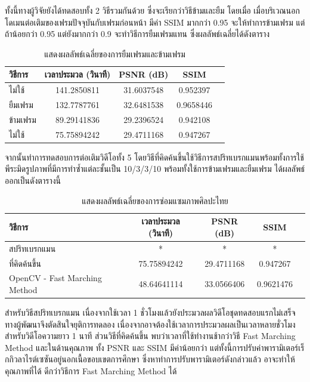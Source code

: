 \documentclass[hidelinks, a4paper,12pt]{article}
\numberwithin{equation}{section}							%
\numberwithin{equation}{section}
\begin{document}
{	\hspace{1cm}ทั้งนี้ทางผู้วิจัยยังได้ทดสอบทั้ง 2 วิธีรวมกันด้วย ซึ่งจะเรียกว่าวิธีข้ามและยืม โดยเมื่อ เมื่อบริเวณนอกโดเมนต่อเติมของเฟรมปัจจุบันกับเฟรมก่อนหน้า มีค่า SSIM มากกว่า 0.95 จะให้ทำการข้ามเฟรม แต่ถ้าน้อยกว่า 0.95 แต่ยังมากกว่า 0.9 จะทำวิธีการยืมเฟรมแทน ซึ่งผลลัพธ์เฉลี่ยได้ดังตาราง
	
	\begin{table}[H]
		\centering
		\begin{tabular}[ht]{|l|c|c|c|c|}
			\hline
			วิธีการ  & เวลาประมวล  (วินาที) & PSNR (dB) & SSIM \\
			\hline
			ไม่ใช้ & 141.2850811 & 31.6037548 & 0.952397 \\
			ยืมเฟรม & 132.7787761 & 32.6481538 & 0.9658446 \\
			ข้ามเฟรม & 89.29141836 & 29.2396524 & 0.942108 \\
			ไม่ใช้ & 75.75894242 & 29.4711168 & 0.947267 \\
			\hline
		\end{tabular}
		\caption{แสดงผลลัพธ์เฉลี่ยของการยืมเฟรมและข้ามเฟรม}
	\end{table}	
	
	\hspace{1cm}  จากนั้นทำการทดสอบการต่อเติมวิดีโอทั้ง 5 โดยวิธีที่คิดค้นขึ้นใช้วิธีการสปริทเบรกแมนพร้อมทั้งการใช้พีระมิดรูปภาพที่มีการทำซ้ำแต่ละชั้นเป็น 10/3/3/10  พร้อมทั้งใช้การข้ามเฟรมและยืมเฟรม ได้ผลลัพธ์ออกเป็นดังตารางนี้
	 
\begin{table}[H]
	\centering
	\begin{tabular}[ht]{|l|c|c|c|c|}
		\hline
		วิธีการ  & เวลาประมวล  (วินาที) & PSNR (dB) & SSIM \\
		\hline
		สปริทเบรกแมน & * & * & * \\
		ที่คิดค้นขึ้น & 75.75894242 & 29.4711168 & 0.947267 \\
		OpenCV - Fast Marching Method & 48.64641114 & 33.0566406 & 0.9621476 \\
		\hline
	\end{tabular}
	\caption{แสดงผลลัพธ์เฉลี่ยของการซ่อมแซมภาพศิลปะไทย}
\end{table}	

\hspace{1cm} สำหรับวิธีสปริทเบรกแมน เนื่องจากใช้เวลา 1 ชั่วโมงแล้วยังประมวลผลวิดีโอชุดทดสอบแรกไม่เสร็จ ทางผู้พัฒนาจึงตัดสินใจยุติการทดลอง เนื่องจากอาจต้องใช้เวลาการประมวลผลเป็นเวลาหลายชั่วโมงสำหรับวิดีโอความยาว 1 นาที ส่วนวิธีที่คิดค้นขึ้น พบว่าเวลาที่ใช้ทำงานช้ากว่าวิธี Fast Marching Method และในด้านคุณภาพ ทั้ง PSNR และ SSIM มีค่าน้อยกว่า แต่ทั้งนี้การปรับค่าพารามิเตอร์เร็กกิวลาไรต์เซซันอยู่นอกเนื้อขอบเขตการศึกษา ซึ่งหาทำการปรับพารามิเตอร์ดังกล่าวแล้ว อาจะทำให้คุณภาพที่ได้ ดีกว่าวิธีการ Fast Marching Method ได้

}
\end{document}
